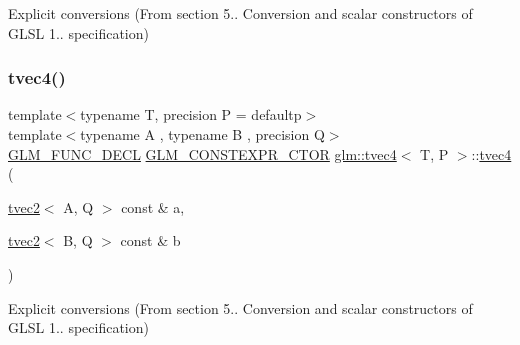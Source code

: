 Explicit conversions (From section 5.. Conversion and scalar constructors of G\+L\+SL 1.. specification) 

\mbox{\label{structglm_1_1tvec4_ab8d5ba79004e6e4d9ca3ee4f06c3d065}} 
\subsubsection{\texorpdfstring{tvec4()}{tvec4()}\hspace{0.1cm}{\footnotesize\ttfamily [19/35]}}
{\footnotesize\ttfamily template$<$typename T, precision P = defaultp$>$ \\
template$<$typename A , typename B , precision Q$>$ \\
\mbox{\hyperlink{setup_8hpp_ab2d052de21a70539923e9bcbf6e83a51}{G\+L\+M\+\_\+\+F\+U\+N\+C\+\_\+\+D\+E\+CL}} \mbox{\hyperlink{setup_8hpp_ad34178a09666081abdb573c14d1f4a5a}{G\+L\+M\+\_\+\+C\+O\+N\+S\+T\+E\+X\+P\+R\+\_\+\+C\+T\+OR}} \mbox{\hyperlink{structglm_1_1tvec4}{glm\+::tvec4}}$<$ T, P $>$\+::\mbox{\hyperlink{structglm_1_1tvec4}{tvec4}} (\begin{DoxyParamCaption}\item[{\mbox{\hyperlink{structglm_1_1tvec2}{tvec2}}$<$ A, Q $>$ const \&}]{a,  }\item[{\mbox{\hyperlink{structglm_1_1tvec2}{tvec2}}$<$ B, Q $>$ const \&}]{b }\end{DoxyParamCaption})}



Explicit conversions (From section 5.. Conversion and scalar constructors of G\+L\+SL 1.. specification) 

\mbox{\label{structglm_1_1tvec4_a2330120079eff2ab383c246d178c1682}} 
